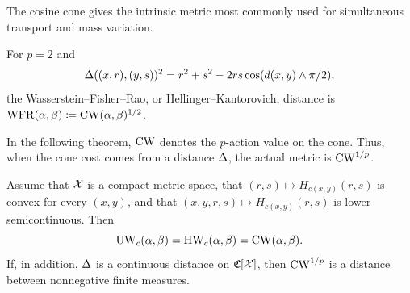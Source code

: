 The cosine cone gives the intrinsic metric most commonly used for simultaneous transport and mass variation.
\begin{defn}\label{def-wfr-distance}
For $p=2$ and
\[
\Delta((x,r),(y,s))^2=r^2+s^2-2rs\cos(d(x,y)\wedge\pi/2),
\]
the Wasserstein--Fisher--Rao, or Hellinger--Kantorovich, distance is
$\operatorname{WFR}(\alpha,\beta)\coloneqq\operatorname{CW}(\alpha,\beta)^{1/2}$.
\end{defn}

In the following theorem, \(\operatorname{CW}\) denotes the \(p\)-action value on the cone. Thus, when the cone cost comes from a distance \(\Delta\), the actual metric is \(\operatorname{CW}^{1/p}\).

\begin{thm}\label{thm-cone-unbalanced-ot}
	Assume that $\mathcal{X}$ is a compact metric space, that $(r,s)\mapsto H_{c(x,y)}(r,s)$ is convex for every $(x,y)$, and that $(x,y,r,s)\mapsto H_{c(x,y)}(r,s)$ is lower semicontinuous. Then
	\[
		\operatorname{UW}_c(\alpha,\beta)=\operatorname{HW}_c(\alpha,\beta)=\operatorname{CW}(\alpha,\beta).
	\]
	If, in addition, $\Delta$ is a continuous distance on $\mathfrak C[\mathcal{X}]$, then $\operatorname{CW}^{1/p}$ is a distance between nonnegative finite measures.
\end{thm}

